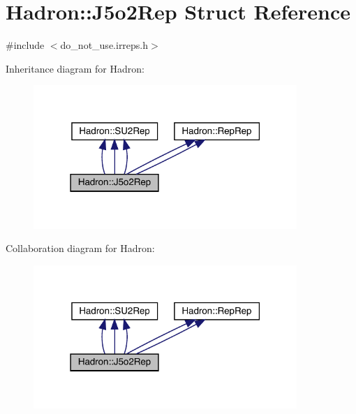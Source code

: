 \hypertarget{structHadron_1_1J5o2Rep}{}\section{Hadron\+:\+:J5o2\+Rep Struct Reference}
\label{structHadron_1_1J5o2Rep}


{\ttfamily \#include $<$do\+\_\+not\+\_\+use.\+irreps.\+h$>$}



Inheritance diagram for Hadron\+:
\nopagebreak
\begin{figure}[H]
\begin{center}
\leavevmode
\includegraphics[width=283pt]{d2/dd9/structHadron_1_1J5o2Rep__inherit__graph}
\end{center}
\end{figure}


Collaboration diagram for Hadron\+:
\nopagebreak
\begin{figure}[H]
\begin{center}
\leavevmode
\includegraphics[width=283pt]{d4/d3e/structHadron_1_1J5o2Rep__coll__graph}
\end{center}
\end{figure}
